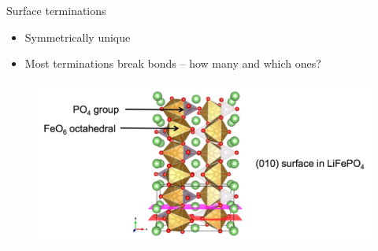 \documentclass[aspectratio=169]{beamer}
\begin{document}
\begin{frame}{Surface terminations}
\begin{itemize}
    \item Symmetrically unique
    \item Most terminations break bonds – how many and which ones? 
\end{itemize}

\begin{figure}
    \includegraphics[width=0.7\linewidth]{lectures/figures/11_LFP_terminations.png}
\end{figure} 

\end{frame} 
\end{document}
